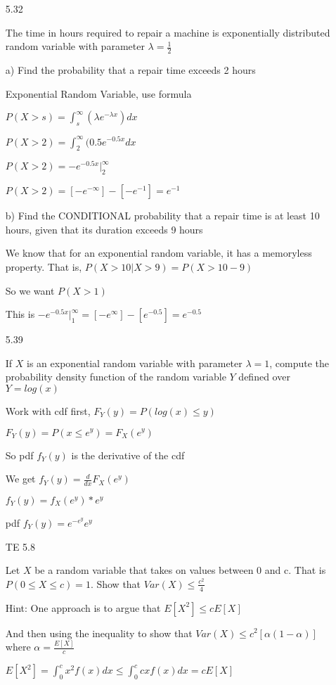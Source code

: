 \documentclass[11pt]{article}
\begin{document}
\begin{itemize}
\item[5.32]

The time in hours required to repair a machine is exponentially distributed random variable with parameter $\lambda = \frac{1}{2}$

a) Find the probability that a repair time exceeds 2 hours

Exponential Random Variable, use formula

$P(X > s) = \int_{s}^{\infty} (\lambda e^{-\lambda x})dx $

$P(X > 2) = \int_{2}^{\infty} (0.5 e^{-0.5 x} dx$

$P(X > 2) = -e^{-0.5x} |_{2}^{\infty}$

$P(X > 2) = [-e^{-\infty}] - [-e^{-1}] = e^{-1}$

b) Find the CONDITIONAL probability that a repair time is at least 10 hours, given that its duration exceeds 9 hours

We know that for an exponential random variable, it has a memoryless property. That is, $P(X > 10 | X > 9) = P(X > 10 - 9)$

So we want $P(X > 1)$

This is $-e^{-0.5x} |_{1}^{\infty} = [-e^{\infty}] - [e^{-0.5}] = e^{-0.5}$
\item[5.39]

If $X$ is an exponential random variable with parameter $\lambda = 1$, compute the probability density function of the random variable $Y$ defined over $Y = log(x)$

Work with cdf first, $F_Y(y) = P(log(x) \leq y)$

$F_Y(y) = P(x \leq e^y) = F_X (e^y)$

So pdf $f_Y(y)$ is the derivative of the cdf

We get $f_Y (y) = \frac{d}{dx} F_X(e^y)$

$f_Y(y) = f_X(e^y)*e^y$

pdf $f_Y(y) = e^{-e^y}e^y$

\item[TE 5.8]

Let $X$ be a random variable that takes on values between 0 and c. That is $P(0 \leq X \leq c) = 1$. Show that $Var(X) \leq \frac{c^2}{4}$

Hint: One approach is to argue that $E[X^2] \leq cE[X]$

And then using the inequality to show that $Var(X) \leq c^2[\alpha(1-\alpha)]$ where $\alpha = \frac{E[X]}{c}$

$E[X^2] = \int_0^{c} x^2 f(x) dx \leq \int_0^{c} cx f(x) dx = cE[X]$


\end{itemize}
\end{document}

